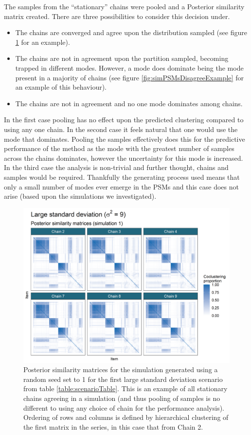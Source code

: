 \documentclass[]{article}
\begin{document}
The samples from the ``stationary'' chains were pooled and a Posterior similarity matrix created. There are three possibilities to consider this decision under.
\begin{itemize}
	\item The chains are converged and agree upon the distribution sampled (see figure \ref{fig:simPSMsAgreeExample} for an example).
	\item The chains are not in agreement upon the partition sampled, becoming trapped in different modes. However, a mode does dominate being the mode present in a majority of chains (see figure \ref{fig:simPSMsDisagreeExample} for an example of this behaviour).
	\item The chains are not in agreement and no one mode dominates among chains.
\end{itemize}
In the first case pooling has no effect upon the predicted clustering compared to using any one chain. In the second case it feels natural that one would use the mode that dominates. Pooling the samples effectively does this for the predictive performance of the method as the mode with the greatest number of samples across the chains dominates, however the uncertainty for this mode is increased. In the third case the analysis is non-trivial and further thought, chains and samples would be required. Thankfully the generating process used means that only a small number of modes ever emerge in the PSMs and this case does not arise (based upon the simulations we investigated).

\begin{figure} %
	\centering
	\includegraphics[scale=0.65]{./Images/Simulations/PSMs/large_standard_deviation_3Sim1.png}
	\caption{Posterior similarity matrices for the simulation generated using a random seed set to 1 for the first large standard deviation scenario from table \ref{table:scenarioTable}. This is an example of all stationary chains agreeing in a simulation (and thus pooling of samples is no different to using any choice of chain for the performance analysis). Ordering of rows and columns is defined by hierarchical clustering of the first matrix in the series, in this case that from Chain 2.}
	\label{fig:simPSMsAgreeExample}
\end{figure}
\end{document}
